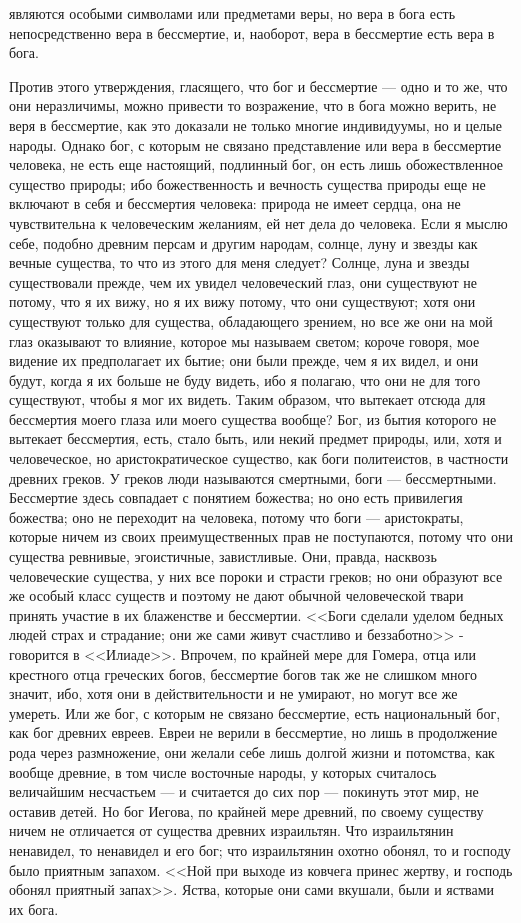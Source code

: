 \documentclass[12pt]{article}
\begin{document}
являются особыми символами или предметами веры, но вера в бога есть непосредственно вера в бессмертие, и, наоборот, вера в бессмертие есть вера в бога. 

Против этого утверждения, гласящего, что бог и бессмертие --- одно и то же, что они неразличимы, можно привести то возражение, что в бога можно верить, не веря в бессмертие, как это доказали не только многие индивидуумы, но и целые народы. Однако бог, с которым не связано представление или вера в бессмертие человека, не есть еще настоящий, подлинный бог, он есть лишь обожествленное существо природы; ибо божественность и вечность существа природы еще не включают в себя и бессмертия человека: природа не имеет сердца, она не чувствительна к человеческим желаниям, ей нет дела до человека. Если я мыслю себе, подобно древним персам и другим народам, солнце, луну и звезды как вечные существа, то что из этого для меня следует? Солнце, луна и звезды существовали прежде, чем их увидел человеческий глаз, они существуют не потому, что я их вижу, но я их вижу потому, что они существуют; хотя они существуют только для существа, обладающего зрением, но все же они на мой глаз оказывают то влияние, которое мы называем светом; короче говоря, мое видение их предполагает их бытие; они были прежде, чем я их видел, и они будут, когда я их больше не буду видеть, ибо я полагаю, что они не для того существуют, чтобы я мог их видеть. Таким образом, что вытекает отсюда для бессмертия моего глаза или моего существа вообще? Бог, из бытия которого не вытекает бессмертия, есть, стало быть, или некий предмет природы, или, хотя и человеческое, но аристократическое существо, как боги политеистов, в частности древних греков. У греков люди называются смертными, боги --- бессмертными. Бессмертие здесь совпадает с понятием божества; но оно есть привилегия божества; оно не переходит на человека, потому что боги --- аристократы, которые ничем из своих преимущественных прав не поступаются, потому что они существа ревнивые, эгоистичные, завистливые. Они, правда, насквозь человеческие существа, у них все пороки и страсти греков; но они образуют все же особый класс существ и поэтому не дают обычной человеческой твари принять участие в их блаженстве и бессмертии. <<Боги сделали уделом бедных людей страх и страдание; они же сами живут счастливо и беззаботно>> - говорится в <<Илиаде>>. Впрочем, по крайней мере для Гомера, отца или крестного отца греческих богов, бессмертие богов так же не слишком много значит, ибо, хотя они в действительности и не умирают, но могут все же умереть. Или же бог, с которым не связано бессмертие, есть национальный бог, как бог древних евреев. Евреи не верили в бессмертие, но лишь в продолжение рода через размножение, они желали себе лишь долгой жизни и потомства, как вообще древние, в том числе восточные народы, у которых считалось величайшим несчастьем --- и считается до сих пор --- покинуть этот мир, не оставив детей. Но бог Иегова, по крайней мере древний, по своему существу ничем не отличается от существа древних израильтян. Что израильтянин ненавидел, то ненавидел и его бог; что израильтянин охотно обонял, то и господу было приятным запахом. <<Ной при выходе из ковчега принес жертву, и господь обонял приятный запах>>. Яства, которые они сами вкушали, были и яствами их бога. 
\end{document}
